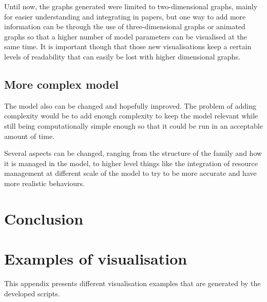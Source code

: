 \documentclass[a4paper,12pt]{report}
\begin{document}
Until now, the graphs generated were limited to two-dimensional graphs, mainly for easier understanding and integrating in papers, but one way to add more information can be through the use of three-dimensional graphs or animated graphs so that a higher number of model parameters can be visualised at the same time. It is important though that those new visualisations keep a certain levels of readability that can easily be lost with higher dimensional graphs.

\section{More complex model}
The model also can be changed and hopefully improved. The problem of adding complexity would be to add enough complexity to keep the model relevant while still being computationally simple enough so that it could be run in an acceptable amount of time.

Several aspects can be changed, ranging from the structure of the family and how it is managed in the model, to higher level things like the integration of resource management at different scale of the model to try to be more accurate and have more realistic behaviours.


\chapter*{Conclusion}




\appendix
\renewcommand{\thesection}{\Roman{section}}
\chapter{Examples of visualisation}
\label{app:ex-visu}

This appendix presents different visualisation examples that are generated by the developed scripts.
\end{document}
